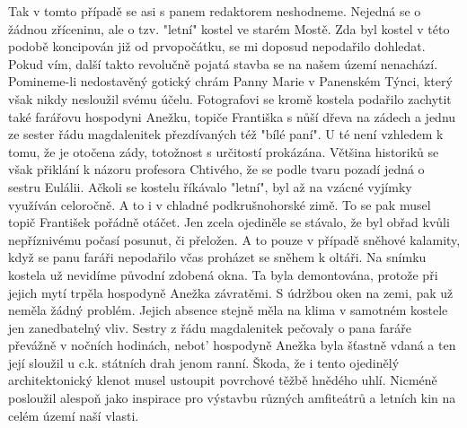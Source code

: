 
Tak v tomto případě se asi s panem redaktorem neshodneme. Nejedná se o
žádnou zříceninu, ale o tzv. "letní" kostel ve starém Mostě. Zda byl
kostel v této podobě koncipován již od prvopočátku, se mi doposud
nepodařilo dohledat. Pokud vím, další takto revolučně pojatá stavba se
na našem území nenachází. Pomineme-li nedostavěný gotický chrám Panny
Marie v Panenském Týnci, který však nikdy nesloužil svému účelu.
Fotografovi se kromě kostela podařilo zachytit také farářovu hospodyni
Anežku, topiče Františka s nůší dřeva na zádech a jednu ze sester řádu
magdalenitek přezdívaných též "bílé paní". U té není vzhledem k tomu,
že je otočena zády, totožnost s určitostí prokázána. Většina historiků
se však přiklání k názoru profesora Chtivého, že se podle tvaru pozadí
jedná o sestru Eulálii. Ačkoli se kostelu říkávalo "letní", byl až na
vzácné vyjímky využíván celoročně. A to i v chladné podkrušnohorské
zimě. To se pak musel topič František pořádně otáčet. Jen zcela
ojediněle se stávalo, že byl obřad kvůli nepříznivému počasí posunut,
či přeložen. A to pouze v případě sněhové kalamity, když se panu
faráři nepodařilo včas proházet se sněhem k oltáři. Na snímku kostela
už nevidíme původní zdobená okna. Ta byla demontována, protože při
jejich mytí trpěla hospodyně Anežka závratěmi. S údržbou oken na zemi,
pak už neměla žádný problém. Jejich absence stejně měla na klima v
samotném kostele jen zanedbatelný vliv. Sestry z řádu magdalenitek
pečovaly o pana faráře převážně v nočních hodinách, nebot' hospodyně
Anežka byla šťastně vdaná a ten její sloužil u c.k. státních drah
jenom ranní. Škoda, že i tento ojedinělý architektonický klenot musel
ustoupit povrchové těžbě hnědého uhlí. Nicméně posloužil alespoň jako
inspirace pro výstavbu různých amfiteátrů a letních kin na celém území
naší vlasti.

